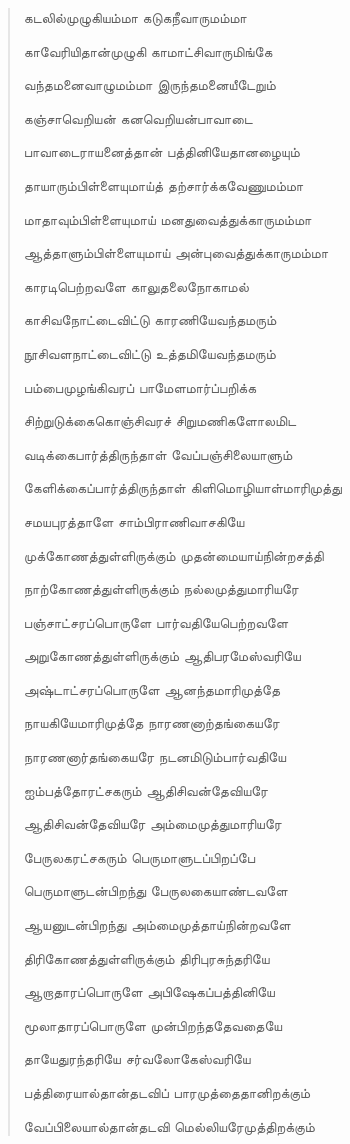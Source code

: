\documentclass{article}
\begin{document}
\begin{quotation}
{கடலில்முழுகியம்மா கடுகநீவாருமம்மா

காவேரியிதான்முழுகி காமாட்சிவாருமிங்கே

வந்தமனைவாழுமம்மா இருந்தமனையீடேறும்

கஞ்சாவெறியன் கனவெறியன்பாவாடை

பாவாடைராயனைத்தான் பத்தினியேதானழையும்

தாயாரும்பிள்ளையுமாய்த் தற்சார்க்கவேணுமம்மா

மாதாவும்பிள்ளையுமாய் மனதுவைத்துக்காருமம்மா

ஆத்தாளும்பிள்ளையுமாய் அன்புவைத்துக்காருமம்மா

காரடிபெற்றவளே காலுதலைநோகாமல்

காசிவநோட்டைவிட்டு காரணியேவந்தமரும்

நூசிவளநாட்டைவிட்டு உத்தமியேவந்தமரும்

பம்பைமுழங்கிவரப் பாமேளமார்ப்பறிக்க

சிற்றுடுக்கைகொஞ்சிவரச் சிறுமணிகளோலமிட

வடிக்கைபார்த்திருந்தாள் வேப்பஞ்சிலையாளும்

கேளிக்கைப்பார்த்திருந்தாள் கிளிமொழியாள்மாரிமுத்து

சமயபுரத்தாளே சாம்பிராணிவாசகியே

முக்கோணத்துள்ளிருக்கும் முதன்மையாய்நின்றசத்தி

நாற்கோணத்துள்ளிருக்கும் நல்லமுத்துமாரியரே

பஞ்சாட்சரப்பொருளே பார்வதியேபெற்றவளே

அறுகோணத்துள்ளிருக்கும் ஆதிபரமேஸ்வரியே

அஷ்டாட்சரப்பொருளே ஆனந்தமாரிமுத்தே

நாயகியேமாரிமுத்தே நாரணனாற்தங்கையரே

நாரணனார்தங்கையரே நடனமிடும்பார்வதியே

ஐம்பத்தோரட்சகரும் ஆதிசிவன்தேவியரே

ஆதிசிவன்தேவியரே அம்மைமுத்துமாரியரே

பேருலகரட்சகரும் பெருமாளுடப்பிறப்பே

பெருமாளுடன்பிறந்து பேருலகையாண்டவளே

ஆயனுடன்பிறந்து அம்மைமுத்தாய்நின்றவளே

திரிகோணத்துள்ளிருக்கும் திரிபுரசுந்தரியே

ஆறாதாரப்பொருளே அபிஷேகப்பத்தினியே

மூலாதாரப்பொருளே முன்பிறந்ததேவதையே

தாயேதுரந்தரியே சர்வலோகேஸ்வரியே

பத்திரையால்தான்தடவிப் பாரமுத்தைதானிறக்கும்

வேப்பிலையால்தான்தடவி மெல்லியரேமுத்திறக்கும்

}
\end{quotation}
\end{document}
